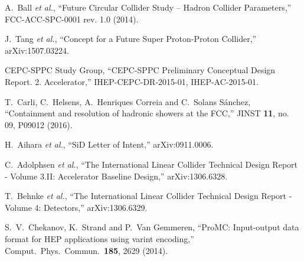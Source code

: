 \documentclass{PoS}
\begin{document}
\begin{thebibliography}{99}
 A.~Ball {\it et al.}, 
``Future Circular Collider Study -- Hadron Collider Parameters,'' 
 FCC-ACC-SPC-0001 rev. 1.0 (2014).

  J.~Tang {\it et al.},
  ``Concept for a Future Super Proton-Proton Collider,''
  arXiv:1507.03224.%



  CEPC-SPPC Study Group,
  ``CEPC-SPPC Preliminary Conceptual Design Report. 2.  Accelerator,''
  IHEP-CEPC-DR-2015-01, IHEP-AC-2015-01.


  T.~Carli, C.~Helsens, A.~Henriques Correia and C.~Solans Sánchez,
  ``Containment and resolution of hadronic showers at the FCC,''
  JINST {\bf 11}, no. 09, P09012 (2016).


  H.~Aihara {\it et al.},
  ``SiD Letter of Intent,''
  arXiv:0911.0006.%

  C.~Adolphsen {\it et al.},
  ``The International Linear Collider Technical Design Report - Volume 3.II: Accelerator Baseline Design,''
  arXiv:1306.6328.%

  T.~Behnke {\it et al.},
  ``The International Linear Collider Technical Design Report - Volume 4: Detectors,''
  arXiv:1306.6329.%


  S.~V.~Chekanov, K.~Strand and P.~Van Gemmeren,
  ``ProMC: Input-output data format for HEP applications using varint encoding,''
  Comput.\ Phys.\ Commun.\  {\bf 185}, 2629 (2014).


\end{thebibliography}
\end{document}
